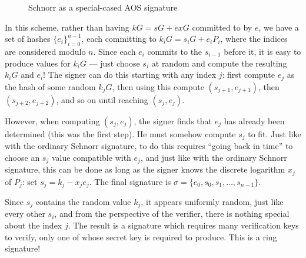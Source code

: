 \documentclass[letterpaper]{article}
\begin{document}
\begin{figure}\label{fig1}
\begin{center}
\end{center}
\caption{Schnorr as a special-cased AOS signature}
\end{figure}

In this scheme, rather than having $kG = sG + exG$ committed to by $e$, we
have a set of hashes $\{e_i\}_{i=0}^{n-1}$, each committing to $k_iG = s_iG
+ e_iP_i$, where the indices are considered modulo $n$. Since each $e_i$ commits
to the $s_{i-1}$ before it, it is easy to produce values for $k_iG$ --- just
choose $s_i$ at random and compute the resulting $k_iG$ and $e_i$! The signer can
do this starting with any index $j$: first compute $e_j$ as the hash of some
random $k_jG$, then using this compute $(s_{j+1}, e_{j+1})$, then $(s_{j+2}, e_{j+2})$,
and so on until reaching $(s_j, e_j)$.

However, when computing $(s_j, e_j)$, the signer finds that $e_j$ has already
been determined (this was the first step). He must somehow compute $s_j$
to fit. Just like with the ordinary Schnorr signature, to do this requires ``going
back in time'' to choose an $s_j$ value compatible with $e_j$, and just
like with the ordinary Schnorr signature, this can be done as long as the signer
knows the discrete logarithm $x_j$ of $P_j$: set $s_j = k_j - x_je_j$. The
final signature is $\sigma = \{ e_0, s_0, s_1, \ldots, s_{n-1} \}$.

Since $s_j$ contains the random value $k_j$, it appears uniformly random, just
like every other $s_i$, and from the perspective of the verifier, there is nothing
special about the index $j$. The result is a signature which requires many verification
keys to verify, only one of whose secret key is required to produce. This is a ring
signature!
\end{document}
